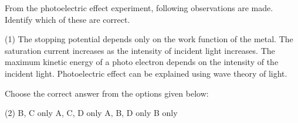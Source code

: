 \item From the photoelectric effect experiment, following observations are made. Identify which of these are correct.
    \begin{tasks}(1)
        \task The stopping potential depends only on the work function of the metal.
        \task The saturation current increases as the intensity of incident light increases.
        \task The maximum kinetic energy of a photo electron depends on the intensity of the incident light.
        \task Photoelectric effect can be explained using wave theory of light.
    \end{tasks}
    
Choose the correct answer from the options given below:
\begin{tasks}(2)
        \task B, C only
        \task A, C, D only
        \task A, B, D only
        \task B only
    \end{tasks}